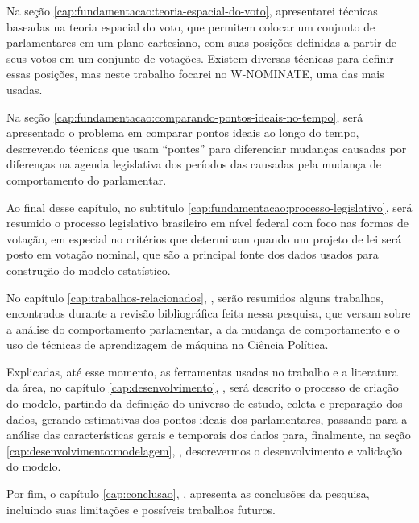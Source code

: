 Na seção \ref{cap:fundamentacao:teoria-espacial-do-voto}, apresentarei técnicas
baseadas na teoria espacial do voto, que permitem colocar um conjunto de
parlamentares em um plano cartesiano, com suas posições definidas a partir de
seus votos em um conjunto de votações. Existem diversas técnicas para definir
essas posições, mas neste trabalho focarei no W-NOMINATE, uma das mais usadas.

Na seção \ref{cap:fundamentacao:comparando-pontos-ideais-no-tempo}, será
apresentado o problema em comparar pontos ideais ao longo do tempo, descrevendo
técnicas que usam ``pontes'' para diferenciar mudanças causadas por diferenças
na agenda legislativa dos períodos das causadas pela mudança de comportamento
do parlamentar.

Ao final desse capítulo, no subtítulo
\ref{cap:fundamentacao:processo-legislativo}, será resumido o processo
legislativo brasileiro em nível federal com foco nas formas de votação, em
especial no critérios que determinam quando um projeto de lei será posto em
votação nominal, que são a principal fonte dos dados usados para construção do
modelo estatístico.

No capítulo \ref{cap:trabalhos-relacionados},
, serão resumidos alguns trabalhos,
encontrados durante a revisão bibliográfica feita nessa pesquisa, que versam
sobre a análise do comportamento parlamentar, a da mudança de comportamento e o
uso de técnicas de aprendizagem de máquina na Ciência Política.

Explicadas, até esse momento, as ferramentas usadas no trabalho e a literatura
da área, no capítulo \ref{cap:desenvolvimento}, ,
será descrito o processo de criação do modelo, partindo da definição do
universo de estudo, coleta e preparação dos dados, gerando estimativas dos
pontos ideais dos parlamentares, passando para a análise das características
gerais e temporais dos dados para, finalmente, na seção
\ref{cap:desenvolvimento:modelagem}, ,
descrevermos o desenvolvimento e validação do modelo.

Por fim, o capítulo \ref{cap:conclusao}, , apresenta as
conclusões da pesquisa, incluindo suas limitações e possíveis trabalhos futuros.
